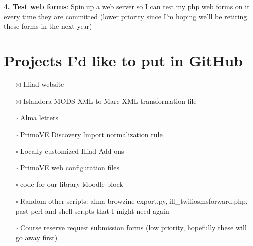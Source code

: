 \documentclass[
  openany]{book}
\providecommand{\tightlist}{%
  \setlength{\itemsep}{0pt}\setlength{\parskip}{0pt}}
\begin{document}
\textbf{4. Test web forms}: Spin up a web server so I can test my php web forms on it every time they are committed (lower priority since I'm hoping we'll be retiring these forms in the next year)

\hypertarget{projects-id-like-to-put-in-github}{%
\chapter{Projects I'd like to put in GitHub}\label{projects-id-like-to-put-in-github}}

\begin{itemize}
\tightlist
\item[$\boxtimes$]
  Illiad website
\item[$\boxtimes$]
  Islandora MODS XML to Marc XML transformation file
\item[$\square$]
  Alma letters
\item[$\square$]
  PrimoVE Discovery Import normalization rule
\item[$\square$]
  Locally customized Illiad Add-ons
\item[$\square$]
  PrimoVE web configuration files
\item[$\square$]
  code for our library Moodle block
\item[$\square$]
  Random other scripts: alma-browzine-export.py, ill\_twiliosmsforward.php, past perl and shell scripts that I might need again
\item[$\square$]
  Course reserve request submission forms (low priority, hopefully these will go away first)
\end{itemize}
\end{document}
